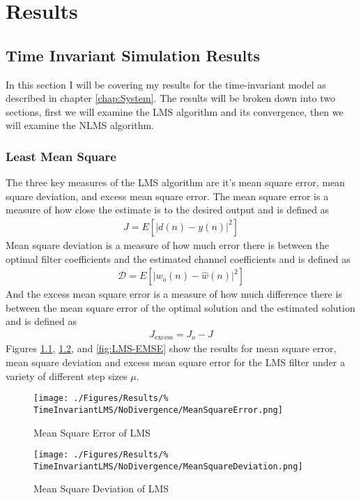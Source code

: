 \chapter{Results}
\label{chap:Results}
\section{Time Invariant Simulation Results}
In this section I will be covering my results for the time-invariant model %
as described in chapter \ref{chap:System}. The results will be broken %
down into two sections, first we will examine the LMS algorithm and %
its convergence, then we will examine the NLMS algorithm.

\subsection{Least Mean Square}
\FloatBarrier
The three key measures of the LMS algorithm are it's mean square error, %
mean square deviation, and excess mean square error. %
The mean square error is a measure of how close the estimate is to the %
desired output and is defined as 
\begin{align}
	J = E\left[ \lvert d(n) - y(n) \rvert^{2} \right]
\end{align}
Mean square deviation is a measure of how much error there is %
between the optimal filter coefficients and the estimated %
channel coefficients and is defined as
\begin{align}
	\mathscr{D} = E\left[ \lvert w_{o}(n) - \hat{w}(n) \rvert^{2} \right]
\end{align}
And the excess mean square error is a measure of how much %
difference there is between the mean square error of the %
optimal solution and the estimated solution and is defined as
\begin{align}
	J_{\text{excess}} = J_{o} - J
\end{align}
Figures \ref{fig:LMS-MSE}, \ref{fig:LMS-MSD}, and \ref{fig:LMS-EMSE} %
show the results for mean square error, mean square deviation and %
excess mean square error for the LMS filter under a variety of %
different step sizes $\mu$.
\begin{figure}[ht]
	\texttt{[image: ./Figures/Results/\%
	TimeInvariantLMS/NoDivergence/MeanSquareError.png]}
	\caption{Mean Square Error of LMS}
	\label{fig:LMS-MSE}
\end{figure}
\begin{figure}[ht]
	\texttt{[image: ./Figures/Results/\%
	TimeInvariantLMS/NoDivergence/MeanSquareDeviation.png]}
	\caption{Mean Square Deviation of LMS}
	\label{fig:LMS-MSD}
\end{figure}

